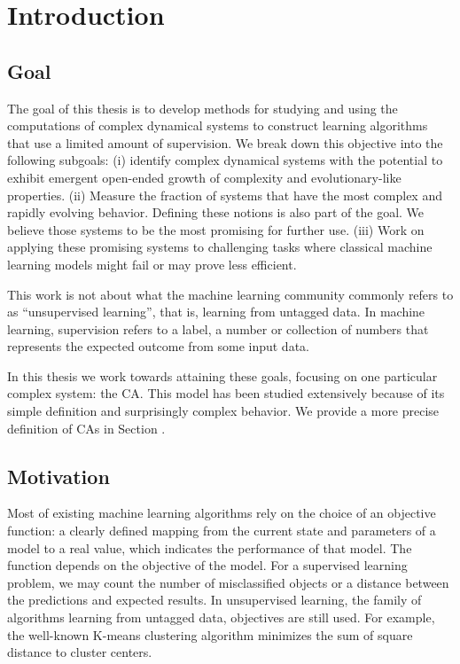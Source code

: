 \chapter{Introduction}


\section{Goal}

The goal of this thesis is to develop methods for studying and using the
computations of complex dynamical systems to construct learning algorithms that
use a limited amount of supervision. We break down this objective into the
following subgoals: (i) identify complex dynamical systems with the potential to
exhibit emergent open-ended growth of complexity and evolutionary-like
properties. (ii) Measure the fraction of systems that have the most complex and
rapidly evolving behavior. Defining these notions is also part of the goal. We
believe those systems to be the most promising for further use. (iii) Work on
applying these promising systems to challenging tasks where classical machine
learning models might fail or may prove less efficient.

This work is not about what the machine learning community commonly refers to as
``unsupervised learning'', that is, learning from untagged data. In machine learning, 
supervision refers to a label, a number or collection of numbers that represents the 
expected outcome from some input data.

In this thesis we work towards attaining these goals, focusing on one particular
complex system: the \acl{CA}. This model has been studied extensively
because of its simple definition and surprisingly complex behavior. We provide a
more precise definition of \aclp{CA} in Section .


\section{Motivation}

Most of existing machine learning algorithms rely on the choice of an objective 
function: a clearly defined mapping from the current state and parameters of a
model to a real value, which indicates the performance of that model. The
function depends on the objective of the model. For a supervised learning problem, we
may count the number of misclassified objects or a distance between the
predictions and expected results. In unsupervised learning, the family of
algorithms learning from untagged data, objectives are still used. For example,
the well-known K-means clustering algorithm minimizes the sum of square distance
to cluster centers.

